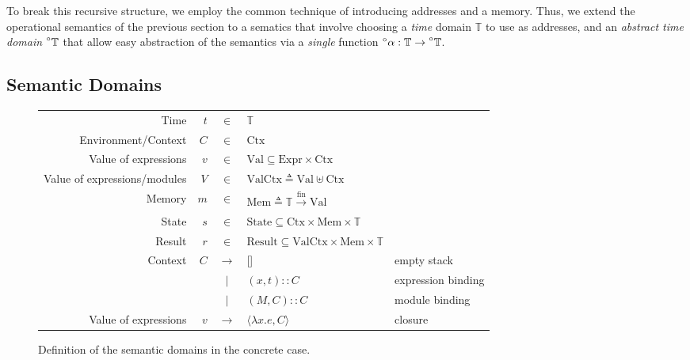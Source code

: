 \documentclass{article}
\theoremstyle{definition}
\newcommand*{\vbar}{|}
\newcommand*{\cons}{::}
\newcommand*{\A}[1]{\prescript{\circ}{}{#1}}
\newcommand*{\Expr}{\text{Expr}}
\newcommand*{\Time}{\mathbb{T}}
\newcommand*{\Ctx}{\text{Ctx}}
\newcommand*{\Value}{\text{Val}}
\newcommand*{\Mem}{\text{Mem}}
\newcommand*{\mem}{m}
\newcommand*{\State}{\text{State}}
\newcommand*{\Result}{\text{Result}}
\newcommand*{\fin}[2]{{#1}\xrightarrow{\text{fin}}{#2}}
\begin{document}
To break this recursive structure, we employ the common technique of introducing addresses and a memory.
Thus, we extend the operational semantics of the previous section to a sematics that involve choosing a \emph{time} domain $\Time$ to use as addresses,
and an \emph{abstract time domain} $\A\Time$ that allow easy abstraction of the semantics via a \emph{single} function $\A\alpha:\Time\rightarrow\A\Time$.

\subsection{Semantic Domains}
\begin{figure}[h!]
  \centering
  \begin{tabular}{rrcll}
    Time                         & $t$    & $\in$         & $\Time$                                                                  \\
    Environment/Context          & $C$    & $\in$         & $\Ctx$                                                                   \\
    Value of expressions         & $v$    & $\in$         & $\Value \subseteq \Expr\times\Ctx$                                       \\
    Value of expressions/modules & $V$    & $\in$         & $\Value\Ctx\triangleq\Value\uplus\Ctx$                                   \\
    Memory                       & $\mem$ & $\in$         & $\Mem \triangleq \fin{\Time}{\Value}$                                    \\
    State                        & $s$    & $\in$         & $\State \subseteq \Ctx\times\Mem\times\Time$                             \\
    Result                       & $r$    & $\in$         & $\Result \subseteq \Value\Ctx\times\Mem\times\Time$                      \\
    Context                      & $C$    & $\rightarrow$ & []                                                  & empty stack        \\
                                 &        & $\vbar$       & $(x,t)\cons C$                                      & expression binding \\
                                 &        & $\vbar$       & $(M,C)\cons C$                                      & module binding     \\
    Value of expressions         & $v$    & $\rightarrow$ & $\langle \lambda x.e, C \rangle$                    & closure
  \end{tabular}
  \caption{Definition of the semantic domains in the concrete case.}
  \label{fig:concdom}
\end{figure}
\end{document}
